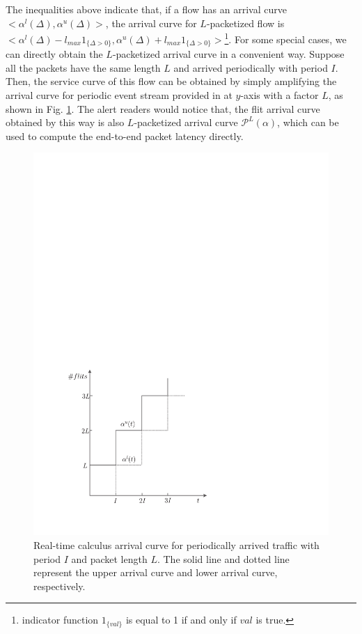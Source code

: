 \documentclass[10pt,journal]{IEEEtran}
\begin{document}
The inequalities above indicate that, if a flow has an arrival curve $<\alpha^l(\Delta),\alpha^u(\Delta)>$, the arrival curve for $L$-packetized flow is $<\alpha^l(\Delta)-l_{max}1_{\{\Delta>0\}},\alpha^u(\Delta)+l_{max}1_{\{\Delta>0\}}>$\footnote{indicator function $1_{\{val\}}$ is equal to 1 if and only if $val$ is true.}. For some special cases, we can directly obtain the $L$-packetized arrival curve in a convenient way. Suppose all the packets have the same length $L$ and arrived periodically with period $I$. Then, the service curve of this flow can be obtained by simply amplifying the arrival curve for periodic event stream provided in \cite{1253607} at $y$-axis with a factor $L$, as shown in Fig. \ref{ac}. The alert readers would notice that, the flit arrival curve obtained by this way is also $L$-packetized arrival curve $\mathcal{P}^L(\alpha)$, which can be used to compute the end-to-end packet latency directly.
\begin{figure}
  \centering
  \includegraphics[scale=0.5]{figures/AC.pdf}
  \caption{Real-time calculus arrival curve for periodically arrived traffic with period $I$ and packet length $L$. The solid line and dotted line represent the upper arrival curve and lower arrival curve, respectively.}\label{ac}
\end{figure}
\end{document}
